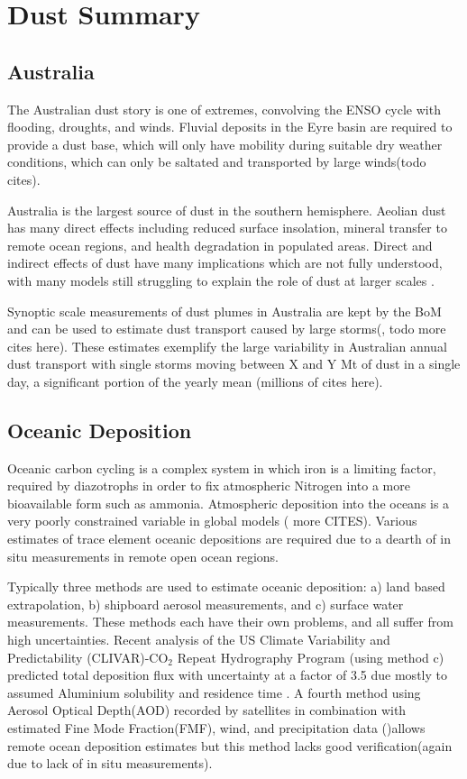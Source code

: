 \section{Dust Summary}

\subsection{Australia}

The Australian dust story is one of extremes, convolving the ENSO cycle with flooding, droughts, and winds.
Fluvial deposits in the Eyre basin are required to provide a dust base, which will only have mobility during suitable dry weather conditions, which can only be saltated and transported by large winds(todo cites).

Australia is the largest source of dust in the southern hemisphere. 
Aeolian dust has many direct effects including reduced surface insolation, mineral transfer to remote ocean regions, and health degradation in populated areas.
Direct and indirect effects of dust have many implications which are not fully understood, with many models still struggling to explain the role of dust at larger scales \cite{Rotstayn_2011}.

Synoptic scale measurements of dust plumes in Australia are kept by the BoM and can be used to estimate dust transport caused by large storms(\cite{Leys_2011}, todo more cites here). 
These estimates exemplify the large variability in Australian annual dust transport with single storms moving between X and Y Mt of dust in a single day, a significant portion of the yearly mean (millions of cites here).

\subsection{Oceanic Deposition}
Oceanic carbon cycling is a complex system in which iron is a limiting factor, required by diazotrophs in order to fix atmospheric Nitrogen into a more bioavailable form such as ammonia. 
Atmospheric deposition into the oceans is a very poorly constrained variable in global models (\cite{Grand_2015} more CITES). 
Various estimates of trace element oceanic depositions are required due to a dearth of in situ measurements in remote open ocean regions.

Typically three methods are used to estimate oceanic deposition: a) land based extrapolation, b) shipboard aerosol measurements, and c) surface water measurements. 
These methods each have their own problems, and all suffer from high uncertainties. 
Recent analysis of the US Climate Variability and Predictability (CLIVAR)-CO$_2$ Repeat Hydrography Program (using method c) predicted total deposition flux with uncertainty at a factor of 3.5 due mostly to assumed Aluminium solubility and residence time \cite{Grand_2015}.
A fourth method using Aerosol Optical Depth(AOD) recorded by satellites in combination with estimated Fine Mode Fraction(FMF), wind, and precipitation data ()allows remote ocean deposition estimates but this method lacks good verification(again due to lack of in situ measurements). 


  
  
  
  
  
  